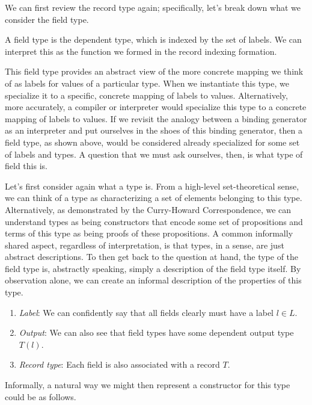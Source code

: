 We can first review the record type again; specifically, let's break down what we consider the field type.
\begin{definition}
 A field type is the dependent type, which is indexed by the set of labels. We can interpret this as the function we formed in the record indexing formation.
  
  
  
 This field type provides an abstract view of the more concrete mapping we think of as labels for values of a particular type. When we instantiate this type, we specialize it to a specific, concrete mapping of labels to values. Alternatively, more accurately, a compiler or interpreter would specialize this type to a concrete mapping of labels to values. If we revisit the analogy between a binding generator as an interpreter and put ourselves in the shoes of this binding generator, then a field type, as shown above, would be considered already specialized for some set of labels and types. A question that we must ask ourselves, then, is what type of field this is.
\end{definition}

Let's first consider again what a type is. From a high-level set-theoretical sense, we can think of a type as characterizing a set of elements belonging to this type. Alternatively, as demonstrated by the Curry-Howard Correspondence, we can understand types as being constructors that encode some set of propositions and terms of this type as being proofs of these propositions. A common informally shared aspect, regardless of interpretation, is that types, in a sense, are just abstract descriptions. To then get back to the question at hand, the type of the field type is, abstractly speaking, simply a description of the field type itself. By observation alone, we can create an informal description of the properties of this type.
\begin{enumerate}
  \item \textit{Label}: We can confidently say that all fields clearly must have a label $l \in L$.
  \item \textit{Output}: We can also see that field types have some dependent output type $T(l)$.
  \item \textit{Record type}: Each field is also associated with a record $T$.
\end{enumerate}

Informally, a natural way we might then represent a constructor for this type could be as follows.

